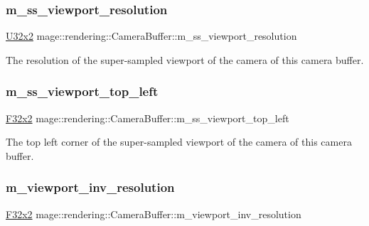 \subsubsection{\texorpdfstring{m\+\_\+ss\+\_\+viewport\+\_\+resolution}{m\_ss\_viewport\_resolution}}
{\footnotesize\ttfamily \mbox{\hyperlink{namespacemage_a31f2bb52b5080e706e1c13de07c0a249}{U32x2}} mage\+::rendering\+::\+Camera\+Buffer\+::m\+\_\+ss\+\_\+viewport\+\_\+resolution}

The resolution of the super-\/sampled viewport of the camera of this camera buffer. \mbox{\label{structmage_1_1rendering_1_1_camera_buffer_a7410f2408daa4e4a69e145eb8d31a2d7}} 
\subsubsection{\texorpdfstring{m\+\_\+ss\+\_\+viewport\+\_\+top\+\_\+left}{m\_ss\_viewport\_top\_left}}
{\footnotesize\ttfamily \mbox{\hyperlink{namespacemage_a9dc0d34d6ecc87e4cfa4a826102117bc}{F32x2}} mage\+::rendering\+::\+Camera\+Buffer\+::m\+\_\+ss\+\_\+viewport\+\_\+top\+\_\+left}

The top left corner of the super-\/sampled viewport of the camera of this camera buffer. \mbox{\label{structmage_1_1rendering_1_1_camera_buffer_a6ba4a1f638f1ace9021b75773265b8a3}} 
\subsubsection{\texorpdfstring{m\+\_\+viewport\+\_\+inv\+\_\+resolution}{m\_viewport\_inv\_resolution}}
{\footnotesize\ttfamily \mbox{\hyperlink{namespacemage_a9dc0d34d6ecc87e4cfa4a826102117bc}{F32x2}} mage\+::rendering\+::\+Camera\+Buffer\+::m\+\_\+viewport\+\_\+inv\+\_\+resolution}

